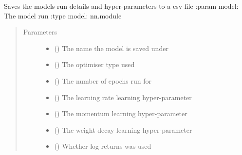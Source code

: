 \documentclass[letterpaper,10pt,english]{sphinxmanual}
\begin{document}
\begin{fulllineitems}
\label{\detokenize{deeplearning:Foresight.deeplearning.full_save}}
Saves the models run details and hyper-parameters to a csv file
:param model:               The model run
:type  model:               nn.module
\begin{quote}\begin{description}
\item[{Parameters}] \leavevmode\begin{itemize}
\item {} 
 () \textendash{} The name the model is saved under

\item {} 
 () \textendash{} The optimiser type used

\item {} 
 () \textendash{} The number of epochs run for

\item {} 
 () \textendash{} The learning rate learning hyper-parameter

\item {} 
 () \textendash{} The momentum learning hyper-parameter

\item {} 
 () \textendash{} The weight decay learning hyper-parameter

\item {} 
 () \textendash{} Whether log returns was used


\end{itemize}
\end{description}
\end{quote}
\end{fulllineitems}
\end{document}

